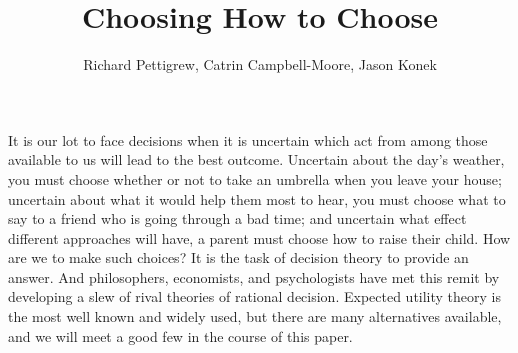 \documentclass[a4paper]{article}
\newcommand{\todoold}[2][]{\todo[backgroundcolor=white,bordercolor=orange!10,linecolor=gray!10, #1,caption={},textcolor=gray]{Pre-rev: #2}}
\newcommand{\todooldinfo}[2][]{\todoold[#1]{#2}}
\newenvironment{CCM rewritten}
{\begingroup\color{blue}} %
{\endgroup}              %
\begin{document}
\title{Choosing How to Choose}
\author{Richard Pettigrew, Catrin Campbell-Moore, Jason Konek}
\maketitle



\begin{comment}
	\todooldinfo[inline]{CCM
	
Todo/questions:
\begin{enumerate}
	\item Refs to Teddy?
	\item Indep stuff
	\item imprecise nu and ead?
	\item Add a bit more explicit proof of result for maximality stuff, it's not immediate and I need to think it through to get the non-independence version clear in my head!
	\item ...?
\end{enumerate}
}
\end{comment}






It is our lot to face decisions when it is uncertain which act from among those available to us will lead to the best outcome. Uncertain about the day's weather, you must choose whether or not to take an umbrella when you leave your house; uncertain about what it would help them most to hear, you must choose what to say to a friend who is going through a bad time; and uncertain what effect different approaches will have, a parent must choose how to raise their child. How are we to make such choices? It is the task of decision theory to provide an answer. And philosophers, economists, and psychologists have met this remit by developing a slew of rival theories of rational decision. Expected utility theory is the most well known and widely used, but there are many alternatives available, and we will meet a good few in the course of this paper.
\end{document}
